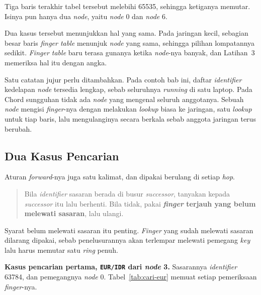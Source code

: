 Tiga baris terakhir tabel tersebut melebihi 65535, sehingga ketiganya memutar.
Isinya pun hanya dua \textit{node}, yaitu \textit{node} 0 dan \textit{node} 6.

Dua kasus tersebut menunjukkan hal yang sama. Pada jaringan kecil, sebagian
besar baris \textit{finger table} menunjuk \textit{node} yang sama, sehingga
pilihan lompatannya sedikit. \textit{Finger table} baru terasa gunanya ketika
\textit{node}-nya banyak, dan Latihan~3 memeriksa hal itu dengan angka.

Satu catatan jujur perlu ditambahkan. Pada contoh bab ini, daftar \textit{identifier} kedelapan
\textit{node} tersedia lengkap, sebab seluruhnya \textit{running} di satu laptop. Pada
Chord sungguhan tidak ada \textit{node} yang mengenal seluruh anggotanya. Sebuah
\textit{node} mengisi \textit{finger}-nya dengan melakukan \textit{lookup} biasa ke
jaringan, satu \textit{lookup} untuk tiap baris, lalu mengulanginya secara
berkala sebab anggota jaringan terus berubah.

\subsection{Dua Kasus Pencarian}

Aturan \textit{forward}-nya juga satu kalimat, dan dipakai berulang di setiap
\textit{hop}.

\begin{quote}
  Bila \textit{identifier} sasaran berada di busur \textit{successor}, tanyakan kepada \textit{successor} itu lalu
  berhenti. Bila tidak, pakai \textbf{\textit{finger} terjauh yang belum melewati sasaran},
  lalu ulangi.
\end{quote}

Syarat belum melewati sasaran itu penting. \textit{Finger} yang sudah melewati sasaran
dilarang dipakai, sebab penelusurannya akan terlempar melewati pemegang \textit{key}
lalu harus memutar satu \textit{ring} penuh.

\textbf{Kasus pencarian pertama, \texttt{EUR/IDR} dari \textit{node} 3.}
Sasarannya \textit{identifier} 63784, dan pemegangnya \textit{node} 0.
Tabel~\ref{tab:cari-eur} memuat setiap pemeriksaan \textit{finger}-nya.

